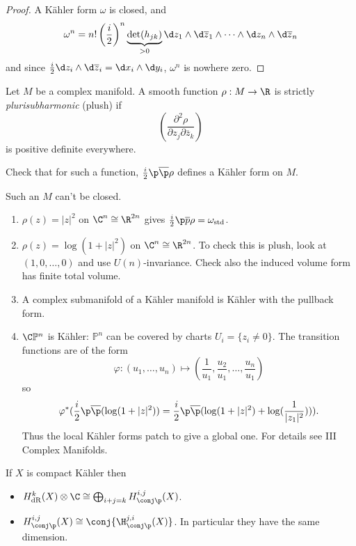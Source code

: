 \documentclass[a4paper]{article}
\renewcommand*{\P}{\mathbb{P}}
\newcommand{\w}{\wedge} %
\begin{document}
\begin{proof}
  A Kähler form \(\omega\) is closed, and
  \[
    \omega^n = n! \left(\frac{i}{2} \right)^n \underbrace{\det(h_{jk})}_{> 0} \d z_1 \w \d \overline z_1 \w \cdots \w \d z_n \w \d \overline z_n
  \]
  and since \(\frac{i}{2} \d z_i \w \d \overline z_i = \d x_i \w \d y_i\), \(\omega^n\) is nowhere zero.
\end{proof}

\begin{definition}[plurisubharmonic]
  Let \(M\) be a complex manifold. A smooth function \(\rho: M \to \R\) is strictly \emph{plurisubharmonic} (plush) if
  \[
    \left( \frac{\partial^2 \rho}{\partial z_j \partial \overline z_k} \right)
  \]
  is positive definite everywhere.
\end{definition}

Check that for such a function, \(\frac{i}{2} \p \overline \p \rho\) defines a Kähler form on \(M\).

\begin{remark}
  Such an \(M\) can't be closed.
\end{remark}

\begin{eg}\leavevmode
  \begin{enumerate}
  \item \(\rho(z) = |z|^2\) on \(\C^n \cong \R^{2n}\) gives \(\frac{i}{2} \p \overline p \rho = \omega_{\text{std}}\).
  \item \(\rho(z) = \log(1 + |z|^2)\) on \(\C^n \cong \R^{2n}\). To check this is plush, look at \((1, 0, \dots, 0)\) and use \(U(n)\)-invariance. Check also the induced volume form has finite total volume.
  \item A complex submanifold of a Kähler manifold is Kähler with the pullback form.
  \item \(\C \P^n\) is Kähler: \(\P^n\) can be covered by charts \(U_i = \{z_i \ne 0\}\). The transition functions are of the form
    \[
      \varphi: (u_1, \dots, u_n) \mapsto (\frac{1}{u_1}, \frac{u_2}{u_1}, \dots, \frac{u_n}{u_1})
    \]
    so
    \[
      \varphi^*(\frac{i}{2} \p \overline \p(\log(1 + |z|^2))
      = \frac{i}{2} \p \overline \p (\log(1 + |z|^2) + \log (\frac{1}{|z_1|^2}))).
    \]
    Thus the local Kähler forms patch to give a global one. For details see III Complex Manifolds.
  \end{enumerate}
\end{eg}

\begin{theorem}[Hodge]
  If \(X\) is compact Kähler then
  \begin{itemize}
  \item \(H^k_{\mathrm{dR}}(X) \otimes \C \cong \bigoplus_{i + j = k} H^{i, j}_{\conj \p}(X)\).
  \item \(H^{i, j}_{\conj \p}(X) \cong \conj{\H^{j, i}_{\conj \p}(X)}\). In particular they have the same dimension.
  \end{itemize}
\end{theorem}
\end{document}
